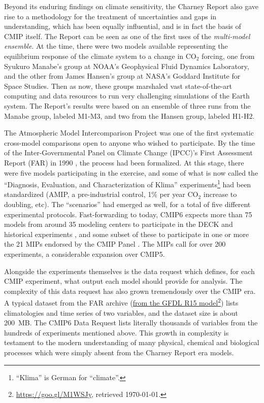 \documentclass[gmd,manuscript]{copernicus}
\newcommand{\pllabel}[1]{\label{p-#1}\linelabel{l-#1}}
\newcommand{\urlref}[2] {\href{#1}{#2}\footnote{\url{#1}, retrieved \today.}}
\begin{document}
Beyond its
\pllabel{RC2-4}
enduring findings on climate sensitivity, the Charney Report also gave
rise to a methodology for the treatment of uncertainties and gaps in
understanding, which has been equally influential, and is in fact the
basis of CMIP itself. The Report can be seen as one of the first uses
of the \emph{multi-model ensemble}. At the time, there were two models
available \pllabel{RC1-3} representing the equilibrium response of the
climate system to a change in CO$_2$ forcing, one from Syukuro
Manabe's group at NOAA's Geophysical Fluid Dynamics Laboratory, and
the other from James Hansen's group at NASA's Goddard Institute for
Space Studies. Then as now, these groups marshaled vast
state-of-the-art computing and data resources to run very challenging
simulations of the Earth system. The Report's results were based on an
ensemble of
\pllabel{RC2-5}
three runs from the Manabe group, \pllabel{RC1-4} labeled M1-M3, and two
from the Hansen group, \pllabel{RC1-5} labeled H1-H2.

The Atmospheric Model Intercomparison Project
\citep[AMIP:][]{ref:gates1992} was one of the first systematic
cross-model comparisons open to anyone who wished to participate.
\pllabel{RC1-6}
By the time of the Inter-Governmental Panel on Climate Change (IPCC)'s
First Assessment Report (FAR) in 1990 \citep{ref:houghtonetal1992},
\pllabel{RC1-9}
the process had been formalized. At this stage, there were
\pllabel{RC2-6}
five models participating in the exercise, and some of what
\pllabel{RC2-7}
is now called the ``Diagnosis, Evaluation, and Characterization of
Klima'' \citep[DECK, see][]{ref:eyringetal2016a}
experiments\footnote{``Klima'' is German for ``climate''.} had been
standardized (AMIP, a pre-industrial control, 1\% per year CO$_2$
increase to doubling, etc). The ``scenarios'' had emerged as well, for
a total of
\pllabel{RC2-6b}
five different experimental protocols. Fast-forwarding to today, CMIP6
expects more than 75 models from around 35 modeling centers \citep[in
14 countries, a stark contrast to the US monopoly
in][]{ref:charneyetal1979} to participate in the DECK and historical
experiments \citep[Table~2 of][]{ref:eyringetal2016a}, and some subset
of these to participate in one or more the 21 MIPs endorsed by the
CMIP Panel \citep[Table~3 of][, now 23 with two new endorsed MIPs
since]{ref:eyringetal2016a}. \pllabel{RC1-7} The MIPs call for over
200 experiments, a considerable expansion over CMIP5.

Alongside the experiments themselves is the data request which
defines, for each CMIP experiment, what output each model should
provide for analysis. The complexity of this data request has also
grown tremendously over the CMIP era. A typical dataset from the FAR
archive (\urlref{https://goo.gl/M1WSJy}{from the GFDL R15 model}) lists
climatologies and time series of two variables, and the dataset size
is about 200~MB. The CMIP6 Data Request \cite{ref:juckesetal2015}
lists literally thousands of variables from the hundreds of
experiments mentioned above. This growth in complexity is testament to
the modern understanding of many physical, chemical and biological
processes which were simply absent from the Charney Report era models.
\end{document}

